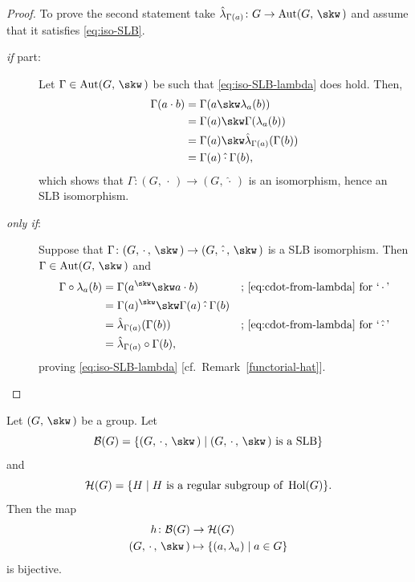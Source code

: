 \begin{proof}
    To prove the second statement take $\hat\lambda_{\Gamma(a)}\colon G\to\Aut(G,\,\skw\,)$ and assume that it satisfies \eqref{eq:iso-SLB}.
    \begin{description}
        \item[\normalfont\textit{ if\/} part:] Let $\Gamma\in\Aut(G,\,\skw\,)$ be such that \eqref{eq:iso-SLB-lambda} does hold. Then,
        \begin{align*}
            \Gamma(a\cdot b) &= \Gamma(a\skw\lambda_a(b))\\
                &= \Gamma(a)\skw\Gamma(\lambda_a(b))\\
                &= \Gamma(a)\skw\hat\lambda_{\Gamma(a)}(\Gamma(b))\\
                &= \Gamma(a)\mathbin{\hat\cdot}\Gamma(b),
        \end{align*}
        which shows that $\Gamma\colon(G,\,\cdot\,)\to(G,\,\hat\cdot\,)$ is an isomorphism, hence an SLB isomorphism.

        \item[\normalfont\textit{only if\/}:] Suppose that $\Gamma\colon(G,\,\cdot\,,\,\skw\,)\to(G,\,\hat\cdot\,,\,\skw\,)$ is a SLB isomorphism. Then $\Gamma\in\Aut(G,\,\skw\,)$ and
        \begin{align*}
            \Gamma\circ\lambda_a(b) &= \Gamma(a^\skw\skw a\cdot b)
                    &&\text{; \eqref{eq:cdot-from-lambda} for `$\,\cdot\,$'}\\
                &= \Gamma(a)^\skw\skw\Gamma(a)\mathbin{\hat\cdot}\Gamma(b)\\
                &= \hat\lambda_{\Gamma(a)}(\Gamma(b))
                    &&\text{; \eqref{eq:cdot-from-lambda}
                        for `$\,\mathbin{\hat\cdot}\,$'}\\
                &= \hat\lambda_{\Gamma(a)}\circ\Gamma(b),
        \end{align*}
        proving \eqref{eq:iso-SLB-lambda} [cf.~Remark~\ref{functorial-hat}].
    \end{description}    
\end{proof}

\begin{thm}
    Let $(G,\,\skw\,)$ be a group. Let
    $$
    \mathcal{B}(G) =\set{(G,\,\cdot\,,\,\skw\,)\mid
        (G,\,\cdot\,,\,\skw\,)\text{\upshape\ is a SLB}}
    $$
    and
    $$
    \mathcal{H}(G)=\set{H\mid H\text {\upshape\ is a regular subgroup of } \Hol(G)}.
    $$    
    Then the map
    \begin{align*}
        h\colon\mathcal{B}(G)&\to\mathcal{H}(G)\\
       (G,\,\cdot\,,\,\skw\,)&\mapsto\set{(a,\lambda_a)\mid a\in G}
    \end{align*}
    is bijective.
\end{thm}

